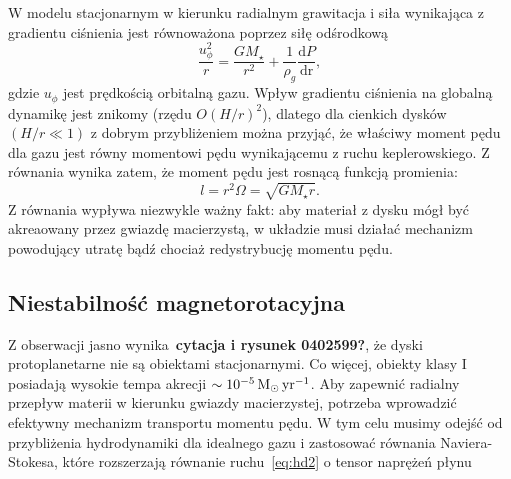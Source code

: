 %
\par W modelu stacjonarnym w kierunku radialnym grawitacja i siła wynikająca z
gradientu ciśnienia jest równoważona poprzez siłę odśrodkową
\begin{equation}\label{eq:radial_balance}
\frac{u_\phi^2}{r} = \frac{GM_\star}{r^2} +
  \frac{1}{\rho_g}\frac{\textrm{d}P}{\textrm{dr}},
\end{equation}
gdzie $u_\phi$ jest prędkością orbitalną gazu. Wpływ gradientu ciśnienia na
globalną dynamikę jest znikomy (rzędu $O(H/r)^2$), dlatego dla cienkich dysków
$(H/r \ll 1)$ z dobrym przybliżeniem można przyjąć, że właściwy moment pędu dla
gazu jest równy momentowi pędu wynikającemu z ruchu keplerowskiego. Z równania
 wynika zatem, że moment pędu jest rosnącą funkcją
promienia:
\begin{equation}\label{eq:angmom}
l = r^2\Omega = \sqrt{GM_\star r}.
\end{equation}
Z równania  wypływa niezwykle ważny fakt: aby materiał z dysku
mógł być akreaowany przez gwiazdę macierzystą, w układzie musi działać mechanizm
powodujący utratę bądź chociaż redystrybucję momentu pędu.
\subsection{Niestabilność magnetorotacyjna}
Z obserwacji jasno wynika~{\bf cytacja i rysunek 0402599?}, że dyski
protoplanetarne nie są obiektami stacjonarnymi. Co więcej, obiekty klasy I
posiadają wysokie tempa akrecji $\sim 10^{-5}\hbox{$\mathrm{\thinspace M_{\odot}}$}\hbox{$\thinspace\textrm{yr}$}^{-1}$. Aby zapewnić
radialny przepływ materii w kierunku gwiazdy macierzystej, potrzeba wprowadzić
efektywny mechanizm transportu momentu pędu. W tym celu musimy odejść od
przybliżenia hydrodynamiki dla idealnego gazu i zastosować równania
Naviera-Stokesa, które rozszerzają równanie ruchu~\ref{eq:hd2} o tensor naprężeń
płynu

